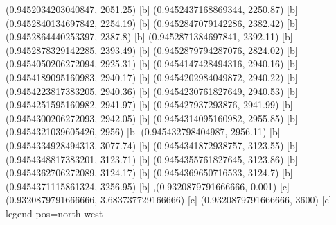 {{{(0.9452034203040847, 2051.25) [b] 
(0.9452437168869344, 2250.87) [b] 
(0.9452840134697842, 2254.19) [b] 
(0.9452847079142286, 2382.42) [b] 
(0.9452864440253397, 2387.8) [b] 
(0.9452871384697841, 2392.11) [b] 
(0.9452878329142285, 2393.49) [b] 
(0.9452879794287076, 2824.02) [b] 
(0.9454050206272094, 2925.31) [b] 
(0.9454147428494316, 2940.16) [b] 
(0.9454189095160983, 2940.17) [b] 
(0.9454202984049872, 2940.22) [b] 
(0.9454223817383205, 2940.36) [b] 
(0.9454230761827649, 2940.53) [b] 
(0.9454251595160982, 2941.97) [b] 
(0.945427937293876, 2941.99) [b] 
(0.9454300206272093, 2942.05) [b] 
(0.9454314095160982, 2955.85) [b] 
(0.9454321039605426, 2956) [b] 
(0.945432798404987, 2956.11) [b] 
(0.9454334928494313, 3077.74) [b] 
(0.9454341872938757, 3123.55) [b] 
(0.9454348817383201, 3123.71) [b] 
(0.9454355761827645, 3123.86) [b] 
(0.9454362706272089, 3124.17) [b] 
(0.9454369650716533, 3124.7) [b] 
(0.9454371115861324, 3256.95) [b] 
},{(0.9320879791666666, 0.001) [c] 
(0.9320879791666666, 3.683737729166666) [c] 
(0.9320879791666666, 3600) [c] 
}}}{legend pos=north west}